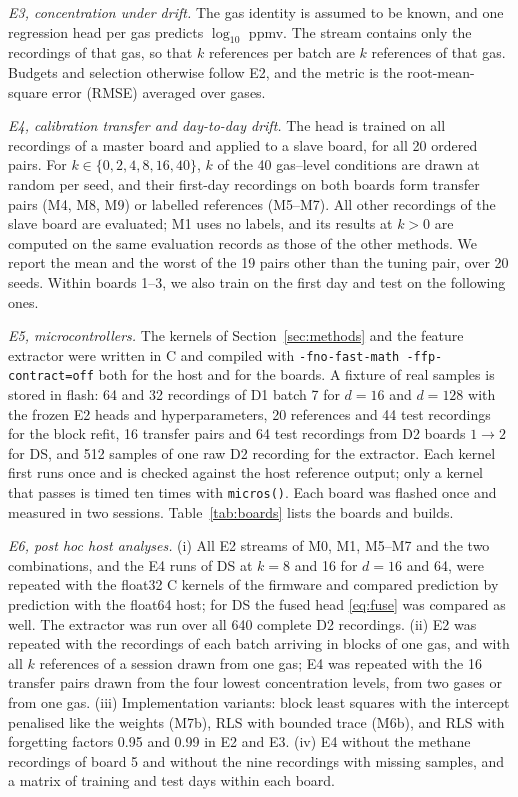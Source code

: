 \documentclass[journal,twoside,web]{ieeecolor}
\begin{document}
\emph{E3, concentration under drift.} \label{sec:e3} The gas identity is assumed to be known, and one regression head per gas predicts $\log_{10}$ ppmv. The stream contains only the recordings of that gas, so that $k$ references per batch are $k$ references of that gas. Budgets and selection otherwise follow E2, and the metric is the root-mean-square error (RMSE) averaged over gases.

\emph{E4, calibration transfer and day-to-day drift.} The head is trained on all recordings of a master board and applied to a slave board, for all 20 ordered pairs. For $k\in\{0,2,4,8,16,40\}$, $k$ of the 40 gas--level conditions are drawn at random per seed, and their first-day recordings on both boards form transfer pairs (M4, M8, M9) or labelled references (M5--M7). All other recordings of the slave board are evaluated; M1 uses no labels, and its results at $k>0$ are computed on the same evaluation records as those of the other methods. We report the mean and the worst of the 19 pairs other than the tuning pair, over 20 seeds. Within boards 1--3, we also train on the first day and test on the following ones.

\emph{E5, microcontrollers.} The kernels of Section~\ref{sec:methods} and the feature extractor were written in C and compiled with \texttt{-fno-fast-math -ffp-contract=off} both for the host and for the boards. A fixture of real samples is stored in flash: 64 and 32 recordings of D1 batch 7 for $d=16$ and $d=128$ with the frozen E2 heads and hyperparameters, 20 references and 44 test recordings for the block refit, 16 transfer pairs and 64 test recordings from D2 boards $1\rightarrow2$ for DS, and 512 samples of one raw D2 recording for the extractor. Each kernel first runs once and is checked against the host reference output; only a kernel that passes is timed ten times with \texttt{micros()}. Each board was flashed once and measured in two sessions. Table~\ref{tab:boards} lists the boards and builds.

\emph{E6, post hoc host analyses.} (i) All E2 streams of M0, M1, M5--M7 and the two combinations, and the E4 runs of DS at $k=8$ and 16 for $d=16$ and 64, were repeated with the float32 C kernels of the firmware and compared prediction by prediction with the float64 host; for DS the fused head \eqref{eq:fuse} was compared as well. The extractor was run over all 640 complete D2 recordings. (ii) E2 was repeated with the recordings of each batch arriving in blocks of one gas, and with all $k$ references of a session drawn from one gas; E4 was repeated with the 16 transfer pairs drawn from the four lowest concentration levels, from two gases or from one gas. (iii) Implementation variants: block least squares with the intercept penalised like the weights (M7b), RLS with bounded trace (M6b), and RLS with forgetting factors 0.95 and 0.99 in E2 and E3. (iv) E4 without the methane recordings of board 5 and without the nine recordings with missing samples, and a matrix of training and test days within each board.
\end{document}
